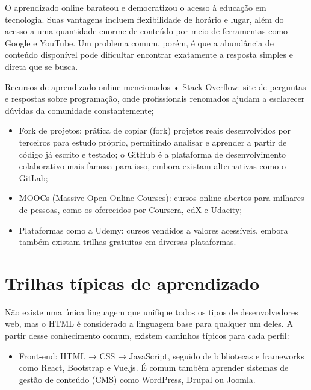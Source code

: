O aprendizado online barateou e democratizou o acesso à educação em tecnologia. Suas vantagens incluem flexibilidade de horário e lugar, além do acesso a uma quantidade enorme de conteúdo por meio de ferramentas como Google e YouTube. Um problema comum, porém, é que a abundância de conteúdo disponível pode dificultar encontrar exatamente a resposta simples e direta que se busca.

\begin{infobox}{Recursos de aprendizado online mencionados}
• Stack Overflow: site de perguntas e respostas sobre programação, onde profissionais renomados ajudam a esclarecer dúvidas da comunidade constantemente;
\end{infobox}

\begin{itemize}
  \item Fork de projetos: prática de copiar (fork) projetos reais desenvolvidos por terceiros para estudo próprio, permitindo analisar e aprender a partir de código já escrito e testado; o GitHub é a plataforma de desenvolvimento colaborativo mais famosa para isso, embora existam alternativas como o GitLab;
\end{itemize}

\begin{itemize}
  \item MOOCs (Massive Open Online Courses): cursos online abertos para milhares de pessoas, como os oferecidos por Coursera, edX e Udacity;
\end{itemize}

\begin{itemize}
  \item Plataformas como a Udemy: cursos vendidos a valores acessíveis, embora também existam trilhas gratuitas em diversas plataformas.
\end{itemize}

\section{Trilhas típicas de aprendizado}

Não existe uma única linguagem que unifique todos os tipos de desenvolvedores web, mas o HTML é considerado a linguagem base para qualquer um deles. A partir desse conhecimento comum, existem caminhos típicos para cada perfil:

\begin{itemize}
  \item Front-end: HTML → CSS → JavaScript, seguido de bibliotecas e frameworks como React, Bootstrap e Vue.js. É comum também aprender sistemas de gestão de conteúdo (CMS) como WordPress, Drupal ou Joomla.
\end{itemize}

